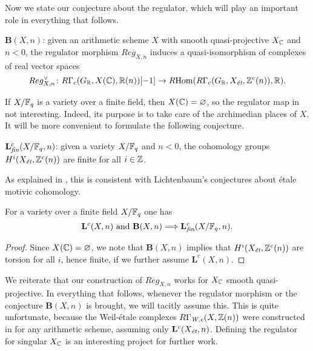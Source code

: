 \documentclass{article}
\numberwithin{equation}{section}
\begin{document}
Now we state our conjecture about the regulator, which will play an important
role in everything that follows.

\begin{conjecture}
  $\mathbf{B} (X,n)$: given an arithmetic scheme $X$ with smooth
  quasi-projective $X_\CC$ and $n < 0$, the regulator morphism $Reg_{X,n}$
  induces a quasi-isomorphism of complexes of real vector spaces
  \[ Reg_{X,n}^\vee\colon R\Gamma_c (G_\RR, X (\CC), \RR (n)) [-1] \to
    \RHom (R\Gamma_c (G_\RR, X_\et, \ZZ^c (n)), \RR). \]
\end{conjecture}

If $X/\FF_q$ is a variety over a finite field, then $X (\CC) = \emptyset$,
so the regulator map in not interesting. Indeed, its purpose is to take care
of the archimedian places of $X$. It will be more convenient to formulate the
following conjecture.

\begin{conjecture}
  $\mathbf{L}_\fin^c (X/\FF_q,n)$: given a variety $X/\FF_q$ and $n < 0$,
  the cohomology groups $H^i (X_\et, \ZZ^c (n))$ are finite for all $i \in \ZZ$.
\end{conjecture}

As explained in \cite[\S 8]{Beshenov-Weil-etale-1}, this is consistent with
Lichtenbaum's conjectures about étale motivic cohomology.

\begin{lemma}
  For a variety over a finite field $X/\FF_q$ one has
  \[ \mathbf{L}^c (X,n) \text{ and } \mathbf{B} (X,n)
    \Longrightarrow \mathbf{L}_\fin^c (X/\FF_q,n). \]

  \begin{proof}
    Since $X (\CC) = \emptyset$, we note that $\mathbf{B} (X,n)$ implies that
    $H^i (X_\et, \ZZ^c (n))$ are torsion for all $i$, hence finite, if we
    further assume $\mathbf{L}^c (X,n)$.
  \end{proof}
\end{lemma}

\begin{remark}
  We reiterate that our construction of $Reg_{X,n}$ works for $X_\CC$ smooth
  quasi-projective. In everything that follows, whenever the regulator morphism
  or the conjecture $\mathbf{B} (X,n)$ is brought, we will tacitly assume this.
  This is quite unfortunate, because the Weil-étale complexes
  $R\Gamma_\Wc (X, \ZZ(n))$ were constructed in \cite{Beshenov-Weil-etale-1} for
  any arithmetic scheme, assuming only $\mathbf{L}^c (X_\et,n)$. Defining the
  regulator for singular $X_\CC$ is an interesting project for further work.
\end{remark}
\end{document}

